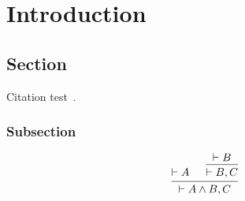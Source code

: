 
\chapter{Introduction}\label{chapter:introduction}

\section{Section}
Citation test~\parencite{isabelle94}.

\subsection{Subsection}


\[
  \begin{prooftree}
    \Hypo{ \vdash A }
    \Hypo{ \vdash B } \Infer1{ \vdash B, C }
    \Infer2{ \vdash A\wedge B, C }
  \end{prooftree}
\]